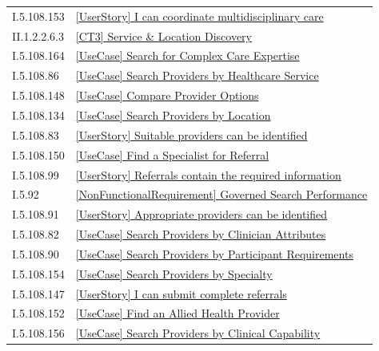 \begin{longtable}{p{.22\linewidth}p{.73\linewidth}}
I.5.108.153 & \hyperref[element:891397624c674a799748400e0477c8c2]{[UserStory] I can coordinate multidisciplinary care} \\
II.1.2.2.6.3 & \hyperref[element:8c313972197c48369767dec1a745d7fc]{[CT3] Service \& Location Discovery} \\
I.5.108.164 & \hyperref[element:9449fdb181e14da48b30e5ff92ffa7d4]{[UseCase] Search for Complex Care Expertise} \\
I.5.108.86 & \hyperref[element:9ba3a010a8e6492ea601eab8cb4f730e]{[UseCase] Search Providers by Healthcare Service} \\
I.5.108.148 & \hyperref[element:9c1d769d00ed4628a3b91a88fbde9ee2]{[UseCase] Compare Provider Options} \\
I.5.108.134 & \hyperref[element:9c76aa9357ba46c59bfaff8079db1263]{[UseCase] Search Providers by Location} \\
I.5.108.83 & \hyperref[element:a14f9f9590b945fd9deea21f32aa5fa4]{[UserStory] Suitable providers can be identified} \\
I.5.108.150 & \hyperref[element:aa163116af0b44b28b3094292be49418]{[UseCase] Find a Specialist for Referral} \\
I.5.108.99 & \hyperref[element:b0949966da1a440eb94eb99d9eaa8a44]{[UserStory] Referrals contain the required information} \\
I.5.92 & \hyperref[element:b29075c844cf403fb1322b4d1aba8803]{[NonFunctionalRequirement] Governed Search Performance} \\
I.5.108.91 & \hyperref[element:b2f5be8380bd4607a0aa09634e382d2b]{[UserStory] Appropriate providers can be identified} \\
I.5.108.82 & \hyperref[element:b607b2f68a3f41c4890e22e5e9ec55ae]{[UseCase] Search Providers by Clinician Attributes} \\
I.5.108.90 & \hyperref[element:bb3dbefbb66b4c848de76bf7fc4a4702]{[UseCase] Search Providers by Participant Requirements} \\
I.5.108.154 & \hyperref[element:c1ef0c81ff7f472ab3ac9cf81c2ef119]{[UseCase] Search Providers by Specialty} \\
I.5.108.147 & \hyperref[element:c24aa2c32a9c484eab3208d6a56668ec]{[UserStory] I can submit complete referrals} \\
I.5.108.152 & \hyperref[element:c5555a551ef84eeab23892aed17ef879]{[UseCase] Find an Allied Health Provider} \\
I.5.108.156 & \hyperref[element:cb63092d64e84e648963cf0b61ec53b0]{[UseCase] Search Providers by Clinical Capability} \\

\end{longtable}
